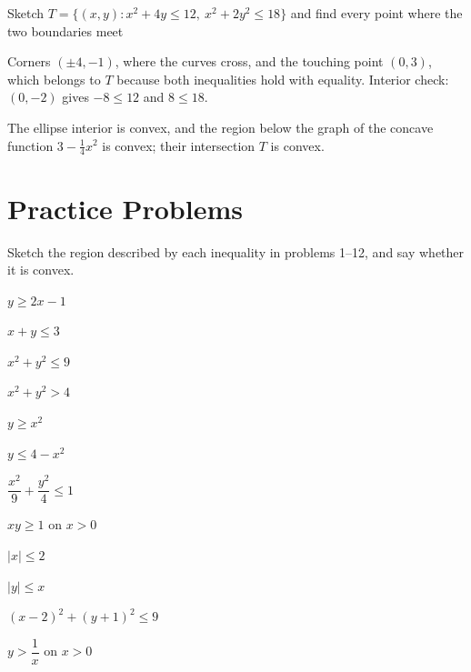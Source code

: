 \begin{worked}{Sketch $T=\{(x,y):x^{2}+4y\le12,\ x^{2}+2y^{2}\le18\}$ and find every point where the two boundaries meet}
\begin{center}
\end{center}
Corners $(\pm4,-1)$, where the curves cross, and the touching point
$(0,3)$, which belongs to $T$ because both inequalities hold with equality.
Interior check: $(0,-2)$ gives $-8\le12$ and $8\le18$. \checkmark

The ellipse interior is convex, and the region below the graph of the
concave function $3-\tfrac14x^{2}$ is convex; their intersection $T$ is
convex.
\end{worked}

\section{Practice Problems}

Sketch the region described by each inequality in problems 1--12, and say
whether it is convex.

\begin{problems}
  \item $y\ge 2x-1$
  \item $x+y\le 3$
  \item $x^{2}+y^{2}\le 9$
  \item $x^{2}+y^{2}>4$
  \item $y\ge x^{2}$
  \item $y\le 4-x^{2}$
  \item $\dfrac{x^{2}}{9}+\dfrac{y^{2}}{4}\le1$
  \item $xy\ge 1$ on $x>0$
  \item $|x|\le 2$
  \item $|y|\le x$
  \item $(x-2)^{2}+(y+1)^{2}\le 9$
  \item $y>\dfrac1x$ on $x>0$
\end{problems}

